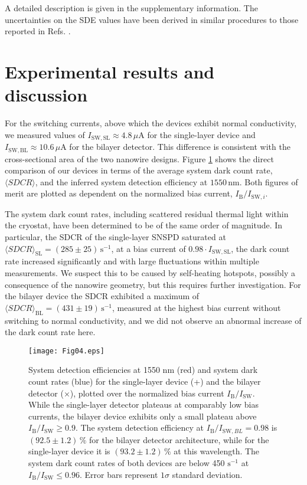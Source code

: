\documentclass[aip,apl,showpacs,showkeys,preprint,superscriptaddress,preprintnumbers,amsmath,amssymb]{revtex4-1}
\begin{document}
\begin{bibunit}
A detailed description is given in the supplementary information. The uncertainties on the SDE values have been derived in similar procedures to those reported in Refs. \cite{Miller2011,Marsili2013}.


\section{Experimental results and discussion}

For the switching currents, above which the devices exhibit normal conductivity, we measured values of $I_\mathrm{SW,SL}\approx4.8\,\mu$A for the single-layer device and $I_\mathrm{SW,BL}\approx10.6\,\mu$A for the bilayer detector. This difference is consistent with the cross-sectional area of the two nanowire designs. Figure \ref{fig:04} shows the direct comparison of our devices in terms of the average system dark count rate, $\langle SDCR\rangle$, and the inferred system detection efficiency at $1550\,\mathrm{nm}$. Both figures of merit are plotted as dependent on the normalized bias current, $I_\mathrm{B}/I_{\mathrm{SW},i}$. 

The system dark count rates, including scattered residual thermal light within the cryostat, have been determined to be of the same order of magnitude. In particular, the SDCR of the single-layer SNSPD saturated at $\langle SDCR\rangle_\mathrm{SL}=(285\pm25)\,\mathrm{s}^{-1}$, at a bias current of $0.98\cdot I_\mathrm{SW,SL}$, the dark count rate increased significantly and with large fluctuations within multiple measurements. We suspect this to be caused by self-heating hotspots\cite{Kerman2009}, possibly a consequence of the nanowire geometry, but this requires further investigation. For the bilayer device the SDCR exhibited a maximum of $\langle SDCR\rangle_\mathrm{BL}=(431\pm19)\,\mathrm{s}^{-1}$, measured at the highest bias current without switching to normal conductivity, and we did not observe an abnormal increase of the dark count rate here. 

\begin{figure}
\texttt{[image: Fig04.eps]}
\caption{\label{fig:04} System detection efficiencies at 1550 nm (red) and system dark count rates (blue) for the single-layer device (+) and the bilayer detector ($\times$), plotted over the normalized bias current $I_\mathrm{B}/I_{\mathrm{SW}}$. While the single-layer detector plateaus at comparably low bias currents, the bilayer device exhibits only a small plateau above $I_\mathrm{B}/I_{\mathrm{SW}}\ge0.9$. The system detection efficiency at $I_\mathrm{B}/I_{\mathrm{SW},BL}=0.98$ is $\left(92.5\pm1.2\right)\,\%$ for the bilayer detector architecture, while for the single-layer device it is $\left(93.2\pm1.2\right)\,\%$ at this wavelength. The system dark count rates of both devices are below 450 $\mathrm{s}^{-1}$ at $I_\mathrm{B}/I_{\mathrm{SW}}\le0.96$. Error bars represent $1\sigma$ standard deviation.}
\end{figure}


\end{bibunit}
\end{document}
